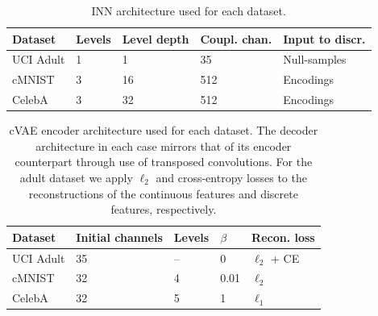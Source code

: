 \begin{table}[tp]
\caption{INN architecture used for each dataset.}
\label{tab:inn_architectures}
\centering
\begin{tabular}{lllll}
\toprule
Dataset & Levels & Level depth & Coupl. chan. & Input to discr. \\ \midrule
UCI Adult                   & 1      & 1     & 35       & Null-samples       \\
cMNIST                      & 3      & 16     & 512      & Encodings               \\
CelebA                      & 3      & 32     & 512      & Encodings        \\ \bottomrule
\end{tabular}
\end{table}

\begin{table}[tp]
\caption{cVAE encoder architecture used for each dataset. The decoder architecture in each case mirrors that of its encoder counterpart through use of transposed convolutions. For the adult dataset we apply $\ell_2$ and cross-entropy losses to the reconstructions of the continuous features and discrete features, respectively.}
\label{tab:vae_architectures}
\centering
\begin{tabular}{lllll}
\toprule
Dataset   & Initial channels & Levels & $\beta$ & Recon. loss \\
\midrule
UCI Adult & 35               & --     & 0       & $\ell_2$ + CE\\
cMNIST    & 32               & 4      & 0.01    & $\ell_2$ \\
CelebA    & 32               & 5      & 1       & $\ell_1$ \\ 
\bottomrule
\end{tabular}
\end{table}


